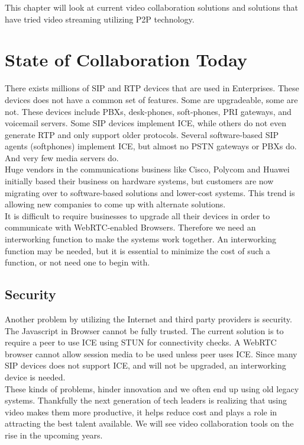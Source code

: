
This chapter will look at current video collaboration solutions and solutions that have tried video streaming utilizing P2P technology.

\section{State of Collaboration Today}
There exists millions of SIP and RTP devices that are used in Enterprises. These devices does not have a common set of features. Some are upgradeable, some are not. These devices include PBXs, desk-phones, soft-phones, PRI gateways, and voicemail servers. Some SIP devices implement ICE, while others do not even generate RTP and only support older protocols. Several software-based SIP agents (softphones) implement ICE, but almost no
PSTN gateways or PBXs do. And very few media servers do.
\\

Huge vendors in the communications business like Cisco, Polycom and Huawei initially based their business on hardware systems, but customers are now migrating over to software-based solutions and lower-cost systems. This trend is allowing new companies to come up with alternate solutions.
\\
It is difficult to require businesses to upgrade all their devices in order to communicate with WebRTC-enabled Browsers. Therefore we need an interworking function to make the systems work together. An interworking function may be needed, but it is essential to minimize the cost of such a function, or not need one to begin with. 
\\

\subsection{Security}
Another problem by utilizing the Internet and third party providers is security. The Javascript in Browser cannot be fully trusted. The current solution is to require a peer to use ICE using STUN for connectivity checks. A WebRTC browser cannot allow session media to be used unless peer uses ICE. Since many SIP devices does not support ICE, and will not be upgraded, an interworking device is needed.
\\
These kinds of problems, hinder innovation and we often end up using old legacy systems. Thankfully the next generation of tech leaders is realizing that using video makes them more productive, it helps reduce cost and plays a role in attracting the best talent available. We will see video collaboration tools on the rise in the upcoming years.


